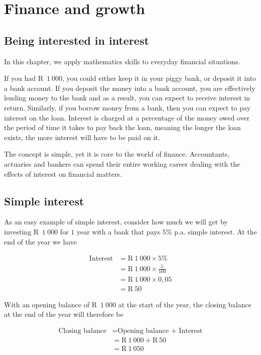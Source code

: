 \chapter{Finance and growth}

\section{Being interested in interest}

In this chapter, we apply mathematics skills to everyday financial situations.\par

If you had R~$1~000$, you could either keep it in your piggy bank, or deposit it into a bank account. If you deposit the
money into a bank account, you are effectively lending money to the bank and as a result, you can expect to receive
interest in return. Similarly, if you borrow money from a bank, then you can expect to pay interest on the loan.
Interest is charged at a percentage of the money owed over the period of time it takes to pay back the loan, meaning
the longer the loan exists, the more interest will have to be paid on it.\par

The concept is simple, yet it is core to the world of finance. Accountants, actuaries and bankers can spend their
entire working career dealing with the effects of interest on financial matters.\par
{}
\section{Simple interest}
  
As an easy example of simple interest, consider how much we will get by investing R~$1~000$ for $1$ year with a bank that pays $5\%$ p.a. simple interest. At the end of the year we have\par
\begin{align*}
    \mbox{Interest} &= \mbox{R}~1~000 \times 5\%\\
    &= \mbox{R}~1~000 \times \frac{5}{100}\\
    &= \mbox{R}~1~000 \times 0,05\\
    &= \mbox{R}~50
\end{align*}

With an opening balance of R~$1~000$ at the start of the year, the closing balance at the end of the year will therefore be\par 
\begin{align*}
    \mbox{Closing balance} &= \mbox{Opening balance + Interest}\\
    &= \mbox{R}~1~000 + \mbox{R}~50\\
    &= \mbox{R}~1~050
\end{align*}

